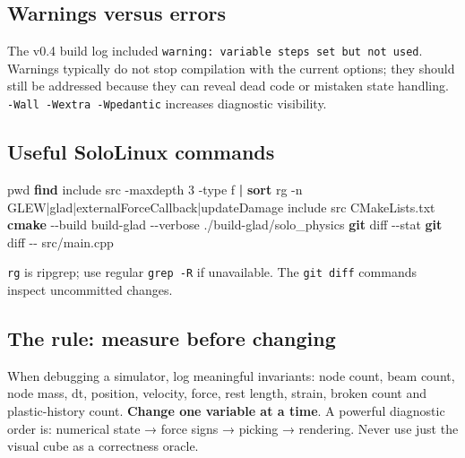 \documentclass[
  10pt,
  a4paper,
]{article}
\newenvironment{Shaded}{\begin{snugshade}}{\end{snugshade}}
\newcommand{\AttributeTok}[1]{\textcolor[rgb]{0.13,0.29,0.53}{#1}}
\newcommand{\BuiltInTok}[1]{#1}
\newcommand{\ExtensionTok}[1]{#1}
\newcommand{\FunctionTok}[1]{\textcolor[rgb]{0.13,0.29,0.53}{\textbf{#1}}}
\newcommand{\KeywordTok}[1]{\textcolor[rgb]{0.13,0.29,0.53}{\textbf{#1}}}
\newcommand{\NormalTok}[1]{#1}
\newcommand{\StringTok}[1]{\textcolor[rgb]{0.31,0.60,0.02}{#1}}
\begin{document}
\subsection{Warnings versus errors}\label{warnings-versus-errors}

The v0.4 build log included
\texttt{warning:\ variable\ \textquotesingle{}steps\textquotesingle{}\ set\ but\ not\ used}.
Warnings typically do not stop compilation with the current options;
they should still be addressed because they can reveal dead code or
mistaken state handling. \texttt{-Wall\ -Wextra\ -Wpedantic} increases
diagnostic visibility.

\subsection{Useful SoloLinux commands}\label{useful-sololinux-commands}

\begin{Shaded}
\begin{Highlighting}[]
\BuiltInTok{pwd}
\FunctionTok{find}\NormalTok{ include src }\AttributeTok{{-}maxdepth}\NormalTok{ 3 }\AttributeTok{{-}type}\NormalTok{ f }\KeywordTok{|} \FunctionTok{sort}
\ExtensionTok{rg} \AttributeTok{{-}n} \StringTok{\textquotesingle{}GLEW|glad|externalForceCallback|updateDamage\textquotesingle{}}\NormalTok{ include src CMakeLists.txt}
\FunctionTok{cmake} \AttributeTok{{-}{-}build}\NormalTok{ build{-}glad }\AttributeTok{{-}{-}verbose}
\ExtensionTok{./build{-}glad/solo\_physics}
\FunctionTok{git}\NormalTok{ diff }\AttributeTok{{-}{-}stat}
\FunctionTok{git}\NormalTok{ diff }\AttributeTok{{-}{-}}\NormalTok{ src/main.cpp}
\end{Highlighting}
\end{Shaded}

\texttt{rg} is ripgrep; use regular \texttt{grep\ -R} if unavailable.
The \texttt{git\ diff} commands inspect uncommitted changes.

\subsection{The rule: measure before
changing}\label{the-rule-measure-before-changing}

When debugging a simulator, log meaningful invariants: node count, beam
count, node mass, dt, position, velocity, force, rest length, strain,
broken count and plastic-history count. \textbf{Change one variable at a
time}. A powerful diagnostic order is: numerical state → force signs →
picking → rendering. Never use just the visual cube as a correctness
oracle.
\end{document}
